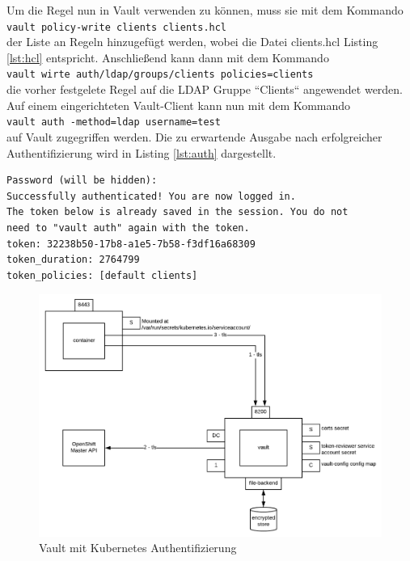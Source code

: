 \documentclass[
book,
a4paper,   
titlepage,  
halfparskip,
12pt        
]{scrartcl}
\newcommand\inline{\lstinline[basicstyle=\ttfamily]}
\begin{document}
\begin{onehalfspacing}
Um die Regel nun in Vault verwenden zu können, muss sie mit dem Kommando\\
\inline|vault policy-write clients clients.hcl|\\
der Liste an Regeln hinzugefügt werden, wobei die Datei clients.hcl Listing \vref{lst:hcl} entspricht. Anschließend kann dann  mit dem Kommando\\
\inline|vault wirte auth/ldap/groups/clients policies=clients|\\
die vorher festgelete Regel auf die \ac{LDAP} Gruppe ``Clients`` angewendet werden.\newline
Auf einem eingerichteten Vault-Client kann nun mit dem Kommando\\
\inline|vault auth -method=ldap username=test|\\
auf Vault zugegriffen werden. Die zu erwartende Ausgabe nach erfolgreicher Authentifizierung wird in Listing \vref{lst:auth} dargestellt.\cite{vaultldap}

\begin{lstlisting}[caption={[\acs{LDAP} Authentifizierung] Kommandozeilenausgabe nach erfolgreicher Authentifizierung durch \acs{LDAP}}, label=lst:auth, captionpos=b, basicstyle=\ttfamily] 
Password (will be hidden):
Successfully authenticated! You are now logged in.
The token below is already saved in the session. You do not
need to "vault auth" again with the token.
token: 32238b50-17b8-a1e5-7b58-f3df16a68309
token_duration: 2764799
token_policies: [default clients]
\end{lstlisting}

\begin{figure}[h]
	\centering
	\includegraphics[width=1\linewidth]{kubauth.png}
	\caption[Kubernetes Authentifizierung]{Vault mit Kubernetes Authentifizierung \cite{kubauth}}
	\label{fig:kubauth}
\end{figure}


\end{onehalfspacing}
\end{document}
